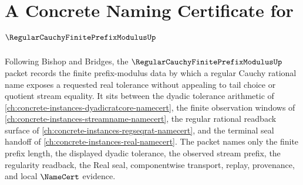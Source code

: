 \chapter{A Concrete Naming Certificate for $\RegularCauchyFinitePrefixModulusUp$}
\label{ch:concrete-instances-regular-cauchy-finite-prefix-modulus-namecert}

Following Bishop and Bridges, the $\RegularCauchyFinitePrefixModulusUp$ packet records the finite prefix-modulus data by which a regular Cauchy rational name exposes a requested real tolerance without appealing to tail choice or quotient stream equality. It sits between the dyadic tolerance arithmetic of \autoref{ch:concrete-instances-dyadicratcore-namecert}, the finite observation windows of \autoref{ch:concrete-instances-streamname-namecert}, the regular rational readback surface of \autoref{ch:concrete-instances-regseqrat-namecert}, and the terminal seal handoff of \autoref{ch:concrete-instances-real-namecert}. The packet names only the finite prefix length, the displayed dyadic tolerance, the observed stream prefix, the regularity readback, the Real seal, componentwise transport, replay, provenance, and local $\NameCert$ evidence.

